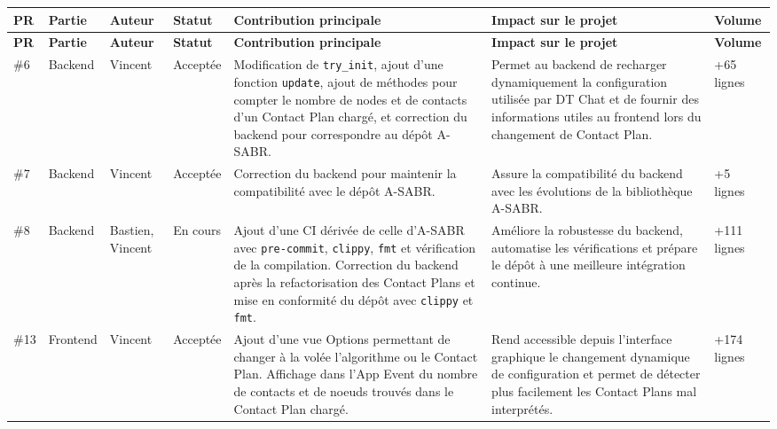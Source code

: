 \documentclass{article}
\begin{document}
\begin{center}
\footnotesize
\setlength{\tabcolsep}{3pt}
\renewcommand{\arraystretch}{1.2}

\begin{longtable}{|p{}|p{}|p{}|p{}|p{}|p{}|p{}|}
\hline
\textbf{PR} & \textbf{Partie} & \textbf{Auteur} & \textbf{Statut} & \textbf{Contribution principale} & \textbf{Impact sur le projet} & \textbf{Volume} \\
\hline
\endfirsthead

\hline
\textbf{PR} & \textbf{Partie} & \textbf{Auteur} & \textbf{Statut} & \textbf{Contribution principale} & \textbf{Impact sur le projet} & \textbf{Volume} \\
\hline
\endhead

\#6 & Backend & Vincent & Acceptée
& Modification de \texttt{try\_init}, ajout d’une fonction \texttt{update}, ajout de méthodes pour compter le nombre de nodes et de contacts d’un Contact Plan chargé, et correction du backend pour correspondre au dépôt A-SABR.
& Permet au backend de recharger dynamiquement la configuration utilisée par DT Chat et de fournir des informations utiles au frontend lors du changement de Contact Plan.
& +65 lignes \\
\hline

\#7 & Backend & Vincent & Acceptée
& Correction du backend pour maintenir la compatibilité avec le dépôt A-SABR.
& Assure la compatibilité du backend avec les évolutions de la bibliothèque A-SABR.
& +5 lignes \\
\hline

\#8 & Backend & Bastien, Vincent & En cours
& Ajout d’une CI dérivée de celle d’A-SABR avec \texttt{pre-commit}, \texttt{clippy}, \texttt{fmt} et vérification de la compilation. Correction du backend après la refactorisation des Contact Plans et mise en conformité du dépôt avec \texttt{clippy} et \texttt{fmt}.
& Améliore la robustesse du backend, automatise les vérifications et prépare le dépôt à une meilleure intégration continue.
& +111 lignes \\
\hline

\#13 & Frontend & Vincent & Acceptée
& Ajout d’une vue Options permettant de changer à la volée l’algorithme ou le Contact Plan. Affichage dans l’App Event du nombre de contacts et de noeuds trouvés dans le Contact Plan chargé.
& Rend accessible depuis l’interface graphique le changement dynamique de configuration et permet de détecter plus facilement les Contact Plans mal interprétés.
& +174 lignes \\
\hline


\end{longtable}
\end{center}
\end{document}
